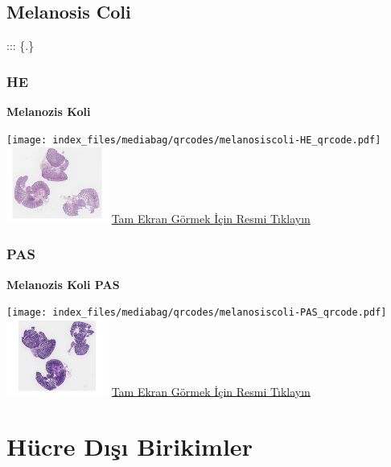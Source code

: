 \documentclass[
  letterpaper,
  DIV=11,
  numbers=noendperiod]{scrreprt}
\begin{document}
\hypertarget{sec-melanosis-coli}{%
\section{Melanosis Coli}\label{sec-melanosis-coli}}

::: \{.\}

\hypertarget{he-3}{%
\subsection{HE}\label{he-3}}

\textbf{Melanozis Koli}

\texttt{[image: index\_files/mediabag/qrcodes/melanosiscoli-HE\_qrcode.pdf]}
\href{https://images.patolojiatlasi.com/melanosiscoli/HE.html}{\includegraphics[width=0.25\textwidth,height=\textheight]{./screenshots/thumbnail_melanosiscoli-HE.png}}
\href{https://images.patolojiatlasi.com/melanosiscoli/HE.html}{Tam Ekran
Görmek İçin Resmi Tıklayın}

\hypertarget{pas-1}{%
\subsection{PAS}\label{pas-1}}

\textbf{Melanozis Koli PAS}

\texttt{[image: index\_files/mediabag/qrcodes/melanosiscoli-PAS\_qrcode.pdf]}
\href{https://images.patolojiatlasi.com/melanosiscoli/PAS.html}{\includegraphics[width=0.25\textwidth,height=\textheight]{./screenshots/thumbnail_melanosiscoli-PAS.png}}
\href{https://images.patolojiatlasi.com/melanosiscoli/PAS.html}{Tam
Ekran Görmek İçin Resmi Tıklayın}

\hypertarget{sec-hucre-disi-birikimler}{%
\chapter{Hücre Dışı Birikimler}\label{sec-hucre-disi-birikimler}}
\end{document}
